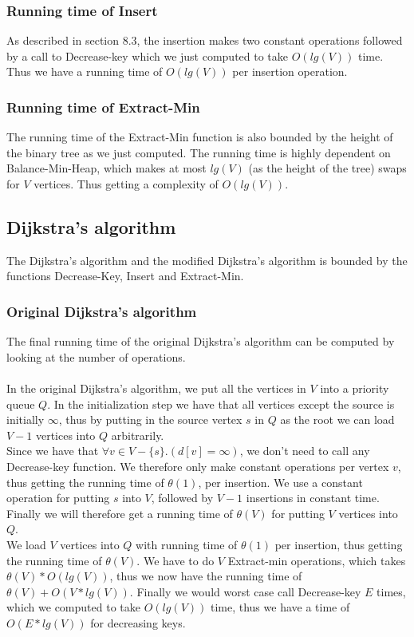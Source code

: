 \documentclass[11pt]{article}
\begin{document}
\subsubsection{Running time of Insert}
As described in section 8.3, the insertion makes two constant operations followed by a call to Decrease-key which we just computed to take $O(lg(V))$ time. Thus we have a running time of $O(lg(V))$ per insertion operation.
\subsubsection{Running time of Extract-Min}
The running time of the Extract-Min function is also bounded by the height of the binary tree as we just computed. The running time is highly dependent on Balance-Min-Heap, which makes at most $lg(V)$ (as the height of the tree) swaps for $V$ vertices. Thus getting a complexity of $O(lg(V))$.
\subsection{Dijkstra's algorithm}
The Dijkstra's algorithm and the modified Dijkstra's algorithm is bounded by the functions Decrease-Key, Insert and Extract-Min.
\subsubsection{Original Dijkstra's algorithm}
\label{sec:clever}
The final running time of the original Dijkstra's algorithm can be computed by looking at the number of operations.\\\\
In the original Dijkstra's algorithm, we put all the vertices in $V$ into a priority queue $Q$. In the initialization step we have that all vertices except the source is initially $\infty$, thus by putting in the source vertex $s$ in $Q$ as the root we can load $V-1$ vertices into $Q$ arbitrarily.\\ 

\noindent Since we have that $\forall v \in V-\{s\}. (d[v] = \infty)$, we don't need to call any Decrease-key function. We therefore only make constant operations per vertex $v$, thus getting the running time of $\theta(1)$, per insertion. We use a constant operation for putting $s$ into $V$, followed by $V-1$ insertions in constant time. Finally we will therefore get a running time of $\theta(V)$ for putting $V$ vertices into $Q$.\\

\noindent We load $V$ vertices into $Q$ with running time of $\theta(1)$ per insertion, thus getting the running time of $\theta(V)$. We have to do $V$ Extract-min operations, which takes $\theta(V) * O(lg(V))$, thus we now have the running time of $\theta(V) + O(V*lg(V))$. Finally we would worst case call Decrease-key $E$ times, which we computed to take $O(lg(V))$ time, thus we have a time of $O(E*lg(V))$ for decreasing keys.\\
\end{document}
